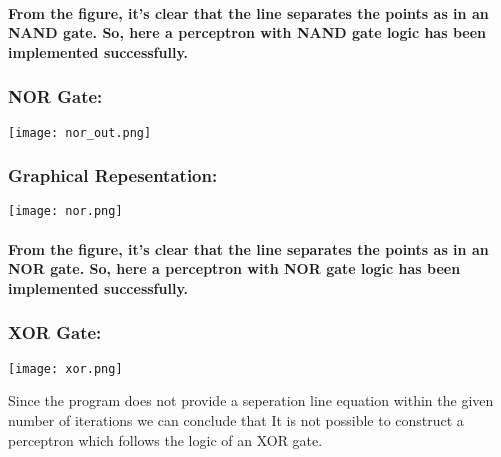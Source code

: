 \documentclass{report}
\begin{document}
\begin{sloppypar}
\paragraph{From the figure, it's clear that the line separates the points as in an NAND gate. So, here a perceptron with NAND gate logic has been implemented successfully. }
\vspace{5mm}

\subsubsection{NOR Gate:}
\vspace{5mm}
\texttt{[image: nor\_out.png]}
\vspace{5mm}
\subsubsection {Graphical Repesentation:}
\vspace{5mm}
\texttt{[image: nor.png]}
\vspace{5mm}
\paragraph{From the figure, it's clear that the line separates the points as in an NOR gate. So, here a perceptron with NOR gate logic has been implemented successfully. }

\subsubsection{XOR Gate:}
\vspace{5mm}
\texttt{[image: xor.png]}
\vspace{5mm}

\large {Since the program does not provide a seperation line equation within the given number of iterations we can conclude that It is not possible to construct a perceptron which follows the logic of an XOR gate. }

\end{sloppypar}
\end{document}

